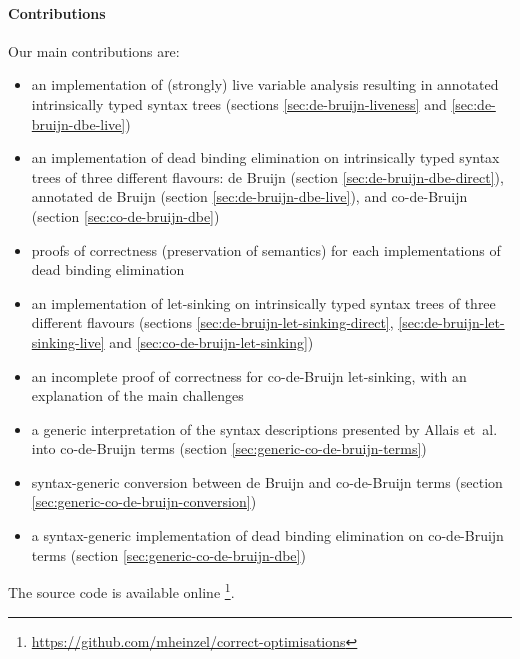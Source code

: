   \paragraph{Contributions}
    Our main contributions are:
    \begin{itemize}
      \item an implementation of (strongly) live variable analysis resulting in annotated intrinsically typed syntax trees
        (sections \ref{sec:de-bruijn-liveness} and \ref{sec:de-bruijn-dbe-live})
      \item an implementation of dead binding elimination on intrinsically typed syntax trees of three different flavours:
        de Bruijn (section \ref{sec:de-bruijn-dbe-direct}),
        annotated de Bruijn (section \ref{sec:de-bruijn-dbe-live}),
        and co-de-Bruijn (section \ref{sec:co-de-bruijn-dbe})
      \item proofs of correctness (preservation of semantics) for each implementations of dead binding elimination
      \item an implementation of let-sinking on intrinsically typed syntax trees of three different flavours
        (sections \ref{sec:de-bruijn-let-sinking-direct}, \ref{sec:de-bruijn-let-sinking-live} and \ref{sec:co-de-bruijn-let-sinking})
      \item an incomplete proof of correctness for co-de-Bruijn let-sinking, with an explanation of the main challenges
      \item a generic interpretation of the syntax descriptions presented by Allais et~al.
        \cite{Allais2018UniverseOfSyntaxes} into co-de-Bruijn terms
        (section \ref{sec:generic-co-de-bruijn-terms})
      \item syntax-generic conversion between de Bruijn and co-de-Bruijn terms
        (section \ref{sec:generic-co-de-bruijn-conversion})
      \item a syntax-generic implementation of dead binding elimination on co-de-Bruijn terms
        (section \ref{sec:generic-co-de-bruijn-dbe})
    \end{itemize}
    The source code is available online%
    \footnote{\url{https://github.com/mheinzel/correct-optimisations}}.
